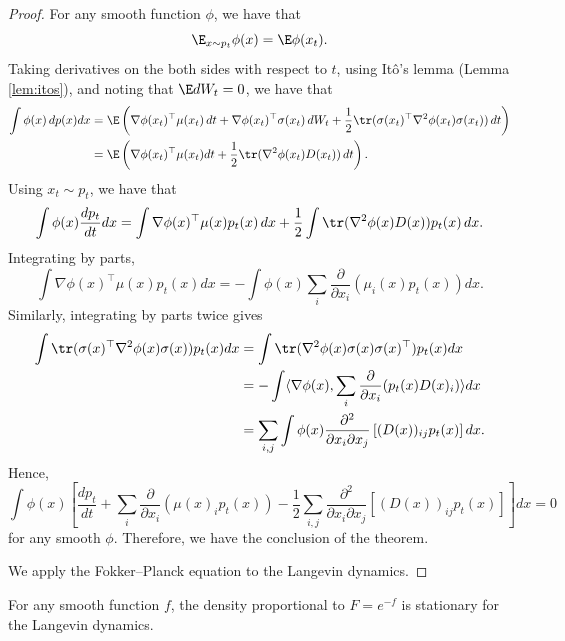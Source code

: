 \begin{proof}
For any smooth function $\phi$, we have that
\[
\E_{x\sim p_{t}}\phi(x)=\E\phi(x_{t}).
\]
Taking derivatives on the both sides with respect to $t$, using It\^{o}'s
lemma (Lemma \ref{lem:itos}), and noting that $\E dW_{t}=0$, we
have that
\begin{align*}
\int\phi(x)\,dp(x)dx & =\E\left(\nabla\phi(x_{t})^{\top}\mu(x_{t})\,dt+\nabla\phi(x_{t})^{\top}\sigma(x_{t})\,dW_{t}+\frac{1}{2}\tr(\sigma(x_{t})^{\top}\nabla^{2}\phi(x_{t})\sigma(x_{t}))\,dt\right)\\
 & =\E\left(\nabla\phi(x_{t})^{\top}\mu(x_{t})dt+\frac{1}{2}\tr(\nabla^{2}\phi(x_{t})D(x_{t}))\,dt\right).
\end{align*}
Using $x_{t}\sim p_{t}$, we have that
\[
\int\phi(x)\frac{dp_{t}}{dt}dx=\int\nabla\phi(x)^{\top}\mu(x)p_{t}(x)\,dx+\frac{1}{2}\int\tr(\nabla^{2}\phi(x)D(x))p_{t}(x)\,dx.
\]
Integrating by parts, 
\[
\int\nabla\phi(x)^{\top}\mu(x)p_{t}(x)dx=-\int\phi(x)\sum_{i}\frac{\partial}{\partial x_{i}}(\mu_{i}(x)p_{t}(x))dx.
\]
Similarly, integrating by parts twice gives
\begin{align*}
\int\tr(\sigma(x)^{\top}\nabla^{2}\phi(x)\sigma(x))p_{t}(x)dx & =\int\tr(\nabla^{2}\phi(x)\sigma(x)\sigma(x)^{\top})p_{t}(x)dx\\
 & =-\int\langle\nabla\phi(x),\sum_{i}\frac{\partial}{\partial x_{i}}(p_{t}(x)D(x)_{i})\rangle dx\\
 & =\sum_{i,j}\int\phi(x)\frac{\partial^{2}}{\partial x_{i}\partial x_{j}}\left[(D(x))_{ij}p_{t}(x)\right]dx.
\end{align*}
Hence, 
\[
\int\phi(x)\left[\frac{dp_{t}}{dt}+\sum_{i}\frac{\partial}{\partial x_{i}}(\mu(x)_{i}p_{t}(x))-\frac{1}{2}\sum_{i,j}\frac{\partial^{2}}{\partial x_{i}\partial x_{j}}\left[(D(x))_{ij}p_{t}(x)\right]\right]dx=0
\]
for any smooth $\phi$. Therefore, we have the conclusion of the theorem.

We apply the Fokker--Planck equation to the Langevin dynamics.
\end{proof}
\begin{thm}
\label{thm:langevin_stationary}For any smooth function $f$, the
density proportional to $F=e^{-f}$ is stationary for the Langevin
dynamics.
\end{thm}

